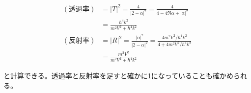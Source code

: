 \documentclass[uplatex,dvipdfmx]{jsarticle}
\begin{document}
\begin{align}
    (透過率) &= |T|^2 = \frac{4}{|2-\alpha|^2}
    = \frac{4}{4-4\Re{\alpha}+|\alpha|^2}\\
    &= \frac{\hbar^4k^2}{m^2V^2+\hbar^4k^2} \\
    (反射率) &= |R|^2 = \frac{|\alpha|^2}{|2-\alpha|^2} = \frac{4m^2V^2/\hbar^4k^2}{4+4m^2V^2/\hbar^4k^2} \\
    &= \frac{m^2V^2}{m^2V^2+\hbar^4k^2}    
\end{align}

と計算できる。透過率と反射率を足すと確かに1になっていることも確かめられる。
\end{document}
